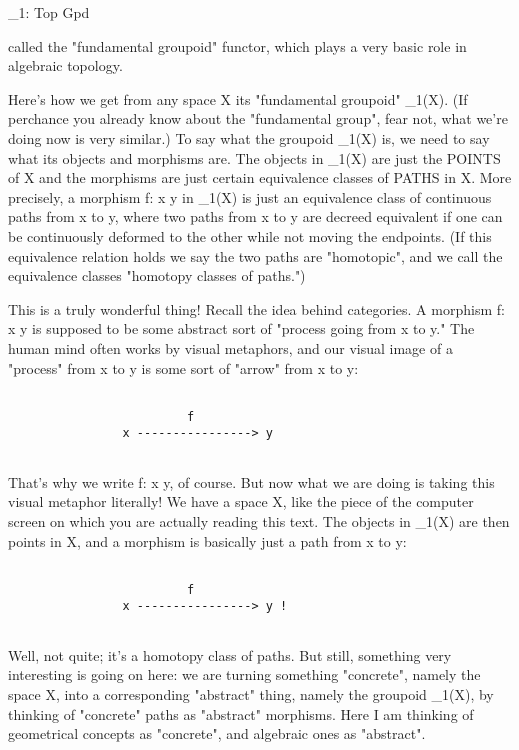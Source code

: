                       \Pi _{1}: Top \to  Gpd

called the "fundamental groupoid" functor, which plays a very basic role
in algebraic topology.  

Here's how we get from any space X its "fundamental groupoid"
\Pi _{1}(X).  (If perchance you already know about the
"fundamental group", fear not, what we're doing now is very
similar.)  To say what the groupoid \Pi _{1}(X) is, we need to say
what its objects and morphisms are.  The objects in \Pi _{1}(X)
are just the POINTS of X and the morphisms are just certain equivalence
classes of PATHS in X.  More precisely, a morphism f: x \to  y in
\Pi _{1}(X) is just an equivalence class of continuous paths from
x to y, where two paths from x to y are decreed equivalent if one can be
continuously deformed to the other while not moving the endpoints.  (If
this equivalence relation holds we say the two paths are
"homotopic", and we call the equivalence classes
"homotopy classes of paths.")

This is a truly wonderful thing!  Recall the idea behind categories.
A morphism f: x \to  y is supposed to be some abstract sort of "process
going from x to y."  The human mind often works by visual metaphors, and
our visual image of a "process" from x to y is some sort of "arrow" from
x to y:


\begin{verbatim}

                         f
                x ----------------> y


\end{verbatim}
    
That's why we write f: x \to  y, of course.  But now what we are doing is
taking this visual metaphor literally!  We have a space X, like the
piece of the computer screen on which you are actually reading this
text.  The objects in \Pi _{1}(X) are then points in X, and a morphism is
basically just a path from x to y:


\begin{verbatim}

                         f
                x ----------------> y !


\end{verbatim}
    
Well, not quite; it's a homotopy class of paths.  But still, something
very interesting is going on here: we are turning something
"concrete", namely the space X, into a corresponding
"abstract" thing, namely the groupoid \Pi _{1}(X), by
thinking of "concrete" paths as "abstract"
morphisms.  Here I am thinking of geometrical concepts as
"concrete", and algebraic ones as "abstract".

